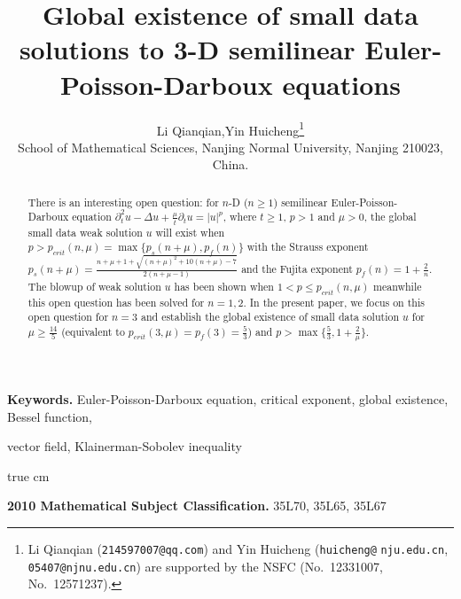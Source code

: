 \documentclass[11pt,twoside]{article}
\title{Global existence of small data solutions to 3-D semilinear Euler-Poisson-Darboux equations}
\author{Li Qianqian,\quad Yin Huicheng\footnote{Li Qianqian (\texttt{214597007@qq.com}) and Yin Huicheng
    (\texttt{huicheng@} \texttt{nju.edu.cn}, \texttt{05407@njnu.edu.cn}) are supported by the NSFC
    (No.~12331007, No.~12571237).}\vspace{0.5cm}\\
\small
School of Mathematical Sciences, Nanjing Normal University, Nanjing 210023, China.\\
}
\newcommand{\p}{\partial}
\newcommand{\f}{\frac}
\theoremstyle{plain}
\theoremstyle{definition}
\theoremstyle{remark}
\numberwithin{equation}{section}
\begin{document}
\date{}

\maketitle
\thispagestyle{empty}

\begin{abstract}
There is an interesting open question:  for $n$-D ($n\ge 1$) semilinear Euler-Poisson-Darboux equation
$\p_t^2u-\Delta u+\f{\mu}{t}\p_tu=|u|^p$, where $t\ge 1$,  $p>1$ and $\mu>0$, the global small data weak solution $u$ will exist
when $p>p_{crit}(n,\mu)=\max\{p_s(n+\mu), p_f(n)\}$ with the Strauss exponent $p_{s}(n+\mu)=\f{n+\mu+1+\sqrt{(n+\mu)^2+10(n+\mu)-7}}{2(n+\mu-1)}$
and the Fujita exponent $p_f(n)=1+\f{2}{n}$. The blowup of weak solution $u$ has been shown when $1<p\le p_{crit}(n,\mu)$
meanwhile this open question has been solved for $n=1,2$.
In the present paper, we focus on this open question for $n=3$ and establish the global existence of small data solution $u$ for $\mu\geq\f{14}{5}$ (equivalent to $p_{crit}(3,\mu)=p_f(3)=\f53$) and $p>\max\{\f53, 1+\f{2}{\mu}\}$.
\end{abstract}

\noindent
\textbf{Keywords.} Euler-Poisson-Darboux equation, critical exponent, global existence, Bessel function,

\qquad \quad vector field, Klainerman-Sobolev inequality

 true cm

\noindent
\textbf{2010 Mathematical Subject Classification.} 35L70, 35L65, 35L67

\tableofcontents

\end{document}
